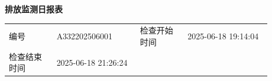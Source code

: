 \documentclass[UTF8,10pt,a4paper,fontset=fandol]{ctexart}
\newcommand{\fieldvalue}[1]{#1}
\begin{document}
\begin{center}
\textbf{排放监测日报表}

\vspace{0.5em}

\begin{tabular}{p{0.16\linewidth}p{0.28\linewidth}p{0.16\linewidth}p{0.28\linewidth}}
编号 &
\fieldvalue{A332202506001} &
检查开始时间 &
\fieldvalue{2025-06-18 19:14:04}
\\
检查结束时间 &
\fieldvalue{2025-06-18 21:26:24} &
\multicolumn{2}{l}{}
\end{tabular}

\vspace{0.75em}


\end{center}
\end{document}
